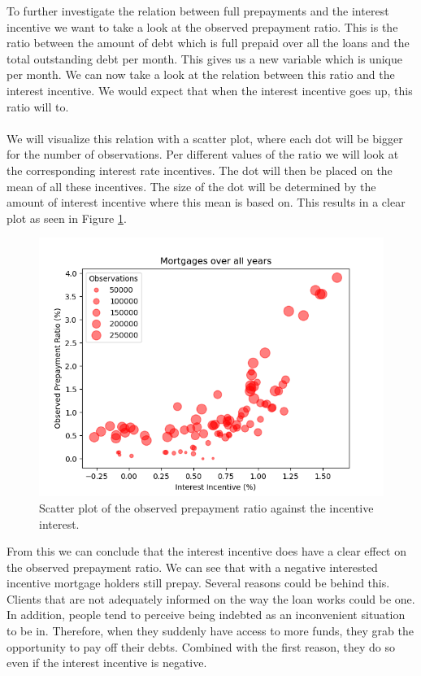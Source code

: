     To further investigate the relation between full prepayments and 
    the interest incentive we want to take a look at the observed 
    prepayment ratio. This is the ratio between the amount of debt 
    which is full prepaid over all the loans and the total outstanding 
    debt per month. This gives us a new variable which is unique per 
    month. We can now take a look at the relation between this ratio 
    and the interest incentive. We would expect that when the 
    interest incentive goes up, this ratio will to. 
    \\\\
    We will visualize this relation with a scatter plot, where each 
    dot will be bigger for the number of observations. Per different 
    values of the ratio we will look at the corresponding interest 
    rate incentives. The dot will then be placed on the mean of all 
    these incentives. The size of the dot will be determined by the 
    amount of interest incentive where this mean is based on. This 
    results in a clear plot as seen in Figure \ref{scatter_interest}.
    \begin{figure}[H]
        \centering
        \includegraphics[scale=0.7]{Figures/Bubbles_all_years.png}
        \caption{Scatter plot of the observed prepayment ratio against the incentive interest.}
        \label{scatter_interest}
    \end{figure}
    From this we can conclude that the interest incentive does have 
    a clear effect on the observed prepayment ratio. We can
    see that with a negative interested incentive mortgage holders 
    still prepay. Several reasons could be behind this. Clients that are not adequately informed on the way the loan works could be one. In addition, people tend to perceive being indebted as an inconvenient situation to be in. Therefore, when they suddenly have access to more funds, they grab the opportunity to pay off their debts. Combined with the first reason, they do so even if the interest incentive is negative.
    

